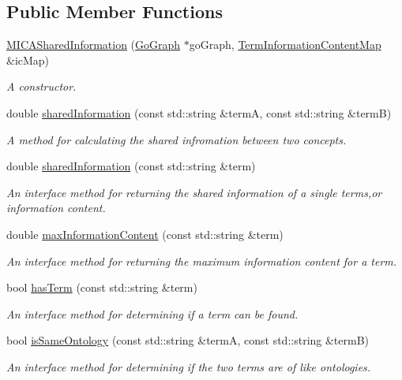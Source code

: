 \subsection*{Public Member Functions}
\begin{DoxyCompactItemize}
\item 
\hyperlink{classMICASharedInformation_a6f377d93f091f1b03511d4e107a0b54b}{M\+I\+C\+A\+Shared\+Information} (\hyperlink{classGoGraph}{Go\+Graph} $\ast$go\+Graph, \hyperlink{classTermInformationContentMap}{Term\+Information\+Content\+Map} \&ic\+Map)
\begin{DoxyCompactList}\small\item\em A constructor. \end{DoxyCompactList}\item 
double \hyperlink{classMICASharedInformation_a8f6329c173f2cd17caf1a65043e8e249}{shared\+Information} (const std\+::string \&termA, const std\+::string \&termB)
\begin{DoxyCompactList}\small\item\em A method for calculating the shared infromation between two concepts. \end{DoxyCompactList}\item 
double \hyperlink{classMICASharedInformation_a230adc046f7f4bbab190aaef25d15a37}{shared\+Information} (const std\+::string \&term)
\begin{DoxyCompactList}\small\item\em An interface method for returning the shared information of a single terms,or information content. \end{DoxyCompactList}\item 
double \hyperlink{classMICASharedInformation_ae88d4a76721e03bbb418eb870fa18ff1}{max\+Information\+Content} (const std\+::string \&term)
\begin{DoxyCompactList}\small\item\em An interface method for returning the maximum information content for a term. \end{DoxyCompactList}\item 
bool \hyperlink{classMICASharedInformation_a0fece18244af62c7e2258b0af418413a}{has\+Term} (const std\+::string \&term)
\begin{DoxyCompactList}\small\item\em An interface method for determining if a term can be found. \end{DoxyCompactList}\item 
bool \hyperlink{classMICASharedInformation_a9cea24c8af57f17248ffe1f12fea9545}{is\+Same\+Ontology} (const std\+::string \&termA, const std\+::string \&termB)
\begin{DoxyCompactList}\small\item\em An interface method for determining if the two terms are of like ontologies. \end{DoxyCompactList}\end{DoxyCompactItemize}


